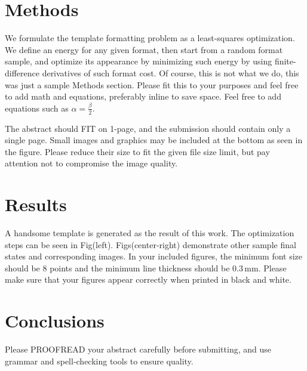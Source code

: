 \documentclass[DIV=calc, paper=a4, fontsize=10pt, twocolumn]{scrartcl}	 %
\begin{document}
\section*{Methods}

We formulate the template formatting problem as a least-squares optimization.  
We define an energy for any given format, then start from a random format sample, and optimize its appearance by minimizing such energy by using finite-difference derivatives of such format cost.  
Of course, this is not what we do, this was just a sample Methods section.  
Please fit this to your purposes and feel free to add math and equations, preferably inline to save space.
Feel free to add equations such as $\alpha = \frac{\beta}{2}$.

The abstract should FIT on 1-page, and the submission should contain only a single page. 
Small images and graphics may be included at the bottom as seen in the figure.
Please reduce their size to fit the given file size limit, but pay attention not to compromise the image quality. 

\lipsum[1]

\lipsum[2]

\section*{Results}

A handsome template is generated as the result of this work. 
The optimization steps can be seen in Fig(left).
Figs(center-right) demonstrate other sample final states and corresponding images.
In your included figures, the minimum font size should be 8 points and the minimum line thickness should be 0.3\,mm.
Please make sure that your figures appear correctly when printed in black and white.

\lipsum[3]

\section*{Conclusions}

Please PROOFREAD your abstract carefully before submitting, and use grammar and spell-checking tools to ensure quality. 
\end{document}
